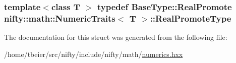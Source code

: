 \subsubsection[{Real\+Promote\+Type}]{\setlength{\rightskip}{0pt plus 5cm}template$<$class T $>$ typedef Base\+Type\+::\+Real\+Promote {\bf nifty\+::math\+::\+Numeric\+Traits}$<$ T $>$\+::{\bf Real\+Promote\+Type}}\label{structnifty_1_1math_1_1NumericTraits_a5030d5141aa16424cd49d272306cd716}


The documentation for this struct was generated from the following file\+:\begin{DoxyCompactItemize}
\item 
/home/tbeier/src/nifty/include/nifty/math/\hyperlink{numerics_8hxx}{numerics.\+hxx}\end{DoxyCompactItemize}
